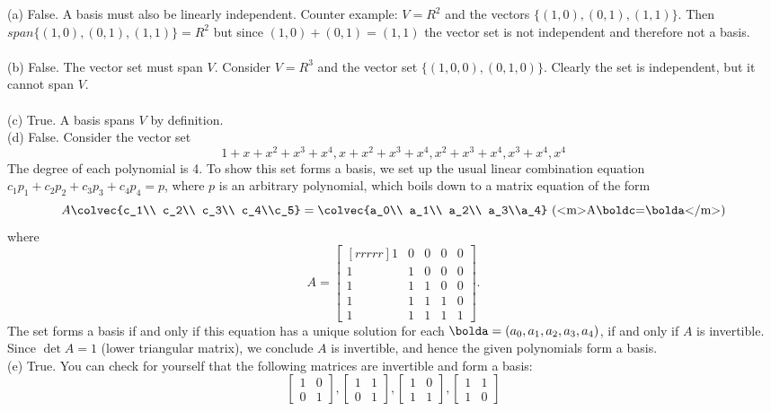 \begin{solution}
\noindent (a) False. A basis must also be linearly independent. Counter example: $V = R^2$ and the vectors $\{(1,0),(0,1),(1,1)\}$. Then $span\{(1,0),(0,1),(1,1)\} = R^2$ but since $(1,0) + (0,1) = (1,1)$ the vector set is not independent and therefore not a basis.
\\
\\ 
(b) False. The vector set must span $V$. Consider $V = R^3$ and the vector set $\{(1,0,0),(0,1,0)\}$. Clearly the set is independent, but it cannot span $V$.
\\ \\ 
(c) True. A basis spans $V$ by definition. 
\\
(d) False. Consider the vector set
$$
1+x+x^2+x^3+x^4, x+x^2+x^3+x^4, x^2+x^3+x^4, x^3+x^4, x^4
$$
The degree of each polynomial is 4. To show this set forms a basis, we set up the usual linear combination equation $c_1p_1+c_2p_2+c_3p_3+c_4p_4=p$, where $p$ is an arbitrary polynomial, which boils down to a matrix equation of the form 
\[
A\colvec{c_1\\ c_2\\ c_3\\ c_4\\c_5}=\colvec{a_0\\ a_1\\ a_2\\ a_3\\a_4} \text{ (<m>A\boldc=\bolda</m>)}
\]
where 
$$
A = 
\begin{bmatrix}[rrrrr]
1&0&0&0&0\\
1&1&0&0&0\\
1&1&1&0&0\\
1&1&1&1&0\\
1&1&1&1&1
\end{bmatrix}.
$$
The set forms a basis if and only if this equation has a unique solution for each $\bolda=(a_0,a_1,a_2,a_3,a_4)$, if and only if $A$ is invertible. Since $\det A=1$ (lower triangular matrix), we conclude $A$ is invertible, and hence the given polynomials form a basis. 
\\
(e) True. You can check for yourself that the following matrices are invertible and form a basis:
\[
\begin{bmatrix}
1&0\\
0&1
\end{bmatrix}, 
\begin{bmatrix}
1&1\\
0&1
\end{bmatrix},
\begin{bmatrix}
1&0\\
1&1
\end{bmatrix},
\begin{bmatrix}
1&1\\
1&0
\end{bmatrix}
\]
\end{solution}

\ee
